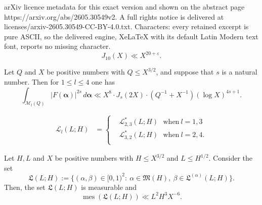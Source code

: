 \documentclass[10pt,a4paper]{amsart}
\DeclareMathOperator{\mes}{mes}
\newcommand{\cM}{{\mathcal M}}
\begin{document}
arXiv licence metadata for this exact version and shown on the abstract page https://arxiv.org/abs/2605.30549v2. A full rights notice is delivered at licenses/arxiv-2605.30549-CC-BY-4.0.txt. Characters: every retained excerpt is pure ASCII, so the delivered engine, XeLaTeX with its default Latin Modern text font, reports no missing character.
\begin{equation}\label{J10}
J_{10}(X) \ll X^{20+\varepsilon}.
\end{equation}

\begin{lemma}\label{basic minor}
    Let $Q$ and $X$ be positive numbers with $Q \le X^{3/2}$, and suppose that $s$ is a natural number. Then for $1 \le l \le 4$ one has
    \begin{equation*}\label{meanvalue lemma 2.2}
        \int_{\cM_l(Q)} |F(\boldsymbol{\alpha})|^{2s}\, d\boldsymbol{\alpha} \ll X^{8} \cdot J_s(2X) \cdot (Q^{-1} + X^{-1})(\log X)^{4s+1}. 
     \end{equation*}
\end{lemma}

\begin{equation}\label{def of Ll(L;H)}
    \begin{aligned}
        \mathcal{L}_l(L;H) &=\left\{\begin{aligned}
            &\mathcal{L}_{2,3}^*(L; H)  \ \ \ \text{when}\ l=1, 3\\
            &\mathcal{L}_{3,2}^*(L; H)\ \ \ \text{when}\ l=2, 4.\\
        \end{aligned}\right.
    \end{aligned}
\end{equation}

\begin{proposition}\label{pro5.2}
Let $H,L$ and $X$ be positive numbers with $H\leq X^{3/2}$ and $L\leq H^{1/2}$. 
  Consider the set
  \begin{equation*}
  \mathfrak{L}(L;H) :=  \{(\alpha,\beta)\in [0,1)^2:\ \alpha\in \mathfrak{M}(H),\ \beta\in \mathfrak{L}^{(\alpha)}(L;H)\}.
  \end{equation*}
  Then, the set  $\mathfrak{L}(L;H)$ is measurable and 
  \begin{equation*}
      \mes{\left(  \mathfrak{L}(L;H)\right)}\ll   L^2H^3X^{-6}.
  \end{equation*}
\end{proposition}
\end{document}
